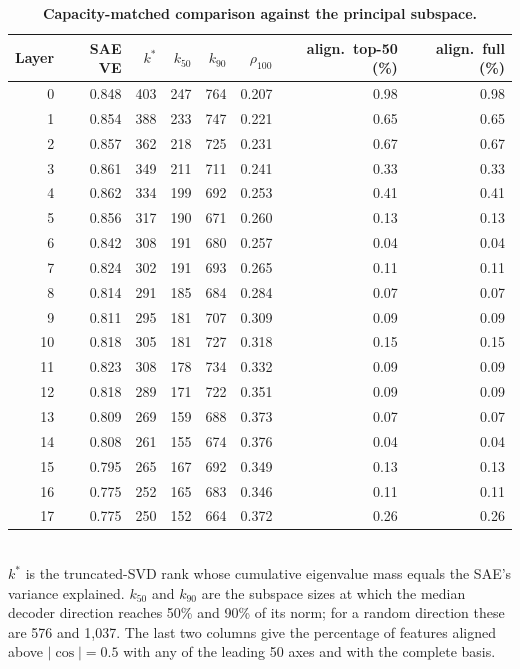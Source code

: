 \begin{table}[htbp]
\centering
\caption{\textbf{Capacity-matched comparison against the principal subspace.}}
\label{tab:svd_capacity}
\smallskip
\small
\begin{tabular}{rrrrrrrr}
\toprule
Layer & SAE VE & $k^{*}$ & $k_{50}$ & $k_{90}$ & $\rho_{100}$ & align.\ top-50 (\%) & align.\ full (\%) \\
\midrule
0 & 0.848 & 403 & 247 & 764 & 0.207 & 0.98 & 0.98 \\
1 & 0.854 & 388 & 233 & 747 & 0.221 & 0.65 & 0.65 \\
2 & 0.857 & 362 & 218 & 725 & 0.231 & 0.67 & 0.67 \\
3 & 0.861 & 349 & 211 & 711 & 0.241 & 0.33 & 0.33 \\
4 & 0.862 & 334 & 199 & 692 & 0.253 & 0.41 & 0.41 \\
5 & 0.856 & 317 & 190 & 671 & 0.260 & 0.13 & 0.13 \\
6 & 0.842 & 308 & 191 & 680 & 0.257 & 0.04 & 0.04 \\
7 & 0.824 & 302 & 191 & 693 & 0.265 & 0.11 & 0.11 \\
8 & 0.814 & 291 & 185 & 684 & 0.284 & 0.07 & 0.07 \\
9 & 0.811 & 295 & 181 & 707 & 0.309 & 0.09 & 0.09 \\
10 & 0.818 & 305 & 181 & 727 & 0.318 & 0.15 & 0.15 \\
11 & 0.823 & 308 & 178 & 734 & 0.332 & 0.09 & 0.09 \\
12 & 0.818 & 289 & 171 & 722 & 0.351 & 0.09 & 0.09 \\
13 & 0.809 & 269 & 159 & 688 & 0.373 & 0.07 & 0.07 \\
14 & 0.808 & 261 & 155 & 674 & 0.376 & 0.04 & 0.04 \\
15 & 0.795 & 265 & 167 & 692 & 0.349 & 0.13 & 0.13 \\
16 & 0.775 & 252 & 165 & 683 & 0.346 & 0.11 & 0.11 \\
17 & 0.775 & 250 & 152 & 664 & 0.372 & 0.26 & 0.26 \\
\bottomrule
\end{tabular}
\\[2pt]
\footnotesize $k^{*}$ is the truncated-SVD rank whose cumulative eigenvalue mass equals the SAE's variance explained. $k_{50}$ and $k_{90}$ are the subspace sizes at which the median decoder direction reaches 50\% and 90\% of its norm; for a random direction these are 576 and 1{,}037. The last two columns give the percentage of features aligned above $|\cos| = 0.5$ with any of the leading 50 axes and with the complete basis.
\end{table}
